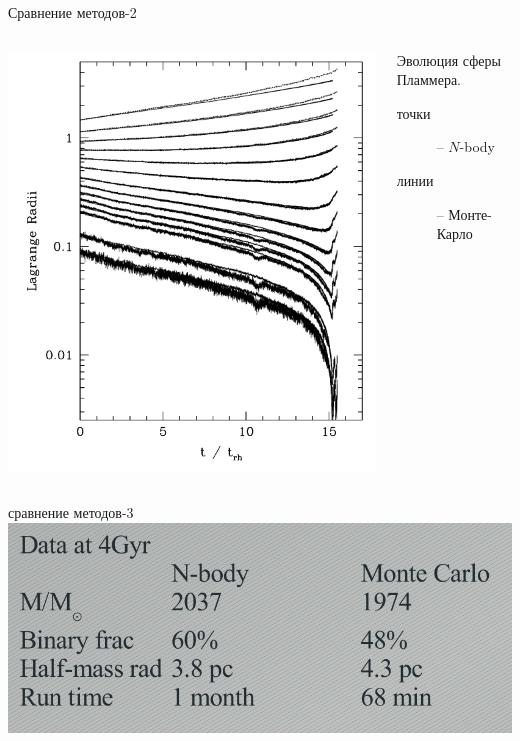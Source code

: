 \documentclass{beamer}
\begin{document}
    \begin{frame}{Сравнение методов-2}
      \begin{columns}
        \begin{column}{0.6\textwidth}
          \includegraphics[width=\textwidth]{img/methodcompplots}
        \end{column}
        \begin{column}{0.4\textwidth}
          \footnotesize
          Эволюция сферы Пламмера.
          \begin{description}
            \item[точки] -- $N$-body 
            \item[линии] -- Монте-Карло 
          \end{description}
          
        \end{column}
      \end{columns}
    \end{frame}
    \begin{frame}{сравнение методов-3}
      \includegraphics[width=0.7\linewidth]{img/methodcomp2}
    \end{frame}
    
\end{document}
